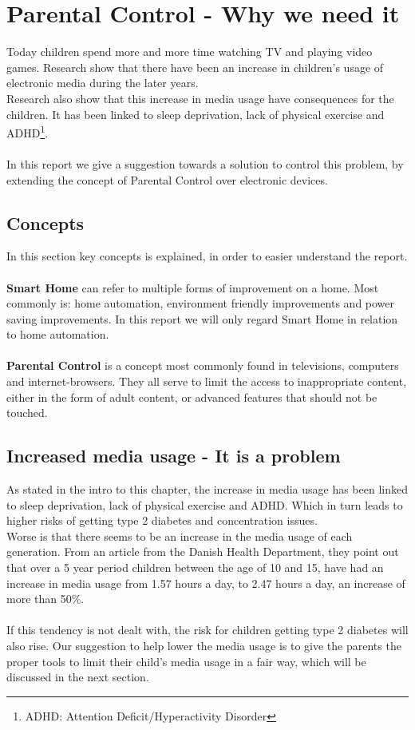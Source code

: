 \chapter{Parental Control - Why we need it}
Today children spend more and more time watching TV and playing video games. Research show that there have been an increase in children's usage of electronic media during the later years. \citep{sundhedsstyrelsen}\\
Research also show that this increase in media usage have consequences for the children. It has been linked to sleep deprivation\citep{bmcPublicHealth}, lack of physical exercise\citep{bmcPublicHealth} and ADHD\footnote{ADHD: Attention Deficit/Hyperactivity Disorder}\citep{mangler}. \\
\\
In this report we give a suggestion towards a solution to control this problem, by extending the concept of Parental Control over electronic devices.

\section{Concepts}
In this section key concepts is explained, in order to easier understand the report.\\
\\
\textbf{Smart Home} can refer to multiple forms of improvement on a home. Most commonly is: home automation, environment friendly improvements and power saving improvements. In this report we will only regard Smart Home in relation to home automation.\\
\\
\textbf{Parental Control} is a concept most commonly found in televisions, computers and internet-browsers. They all serve to limit the access to inappropriate content, either in the form of adult content, or advanced features that should not be touched.

\section{Increased media usage - It is a problem}
As stated in the intro to this chapter, the increase in media usage has been linked to sleep deprivation, lack of physical exercise and ADHD. Which in turn leads to higher risks of getting type 2 diabetes and concentration issues.\\
Worse is that there seems to be an increase in the media usage of each generation. From an article from the Danish Health Department, they point out that over a 5 year period children between the age of 10 and 15, have had an increase in media usage from 1.57 hours a day, to 2.47 hours a day, an increase of more than 50\%.\citep{sundhedsstyrelsen}\\
\\
If this tendency is not dealt with, the risk for children getting type 2 diabetes will also rise. Our suggestion to help lower the media usage is to give the parents the proper tools to limit their child’s media usage in a fair way, which will be discussed in the next section.


